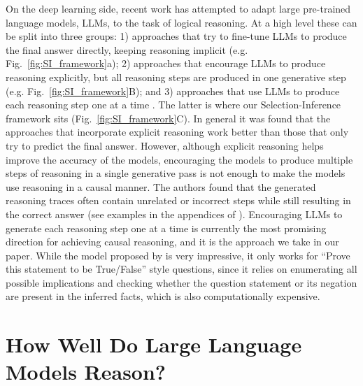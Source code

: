On the deep learning side, recent work has attempted to adapt large pre-trained language models, LLMs, to the task of logical reasoning. At a high level these can be split into three groups: 1) approaches that try to fine-tune LLMs to produce the final answer directly, keeping reasoning implicit \citep{betz2020critical, clark2020transformers} (e.g. Fig.~\ref{fig:SI_framework}a); 2) approaches that encourage LLMs to produce reasoning explicitly, but all reasoning steps are produced in one generative step \citep{nye2021show, zelikman2022star,jhamtani2020learning,Dalvi2021ExplainingAW,wei2022chain,cobbe2021training} (e.g. Fig.~\ref{fig:SI_framework}B); and 3) approaches that use LLMs to produce each reasoning step one at a time \citep{tafjord2020proofwriter}. The latter is where our Selection-Inference framework sits (Fig.~\ref{fig:SI_framework}C). In general it was found that the approaches that incorporate explicit reasoning work better than those that only try to predict the final answer. However, although explicit reasoning helps improve the accuracy of the models, encouraging the models to produce multiple steps of reasoning in a single generative pass is not enough to make the models use reasoning in a causal manner. The authors found that the generated reasoning traces often contain unrelated or incorrect steps while still resulting in the correct answer (see examples in the appendices of \citep{zelikman2022star, wei2022chain}). Encouraging LLMs to generate each reasoning step one at a time \citep{tafjord2020proofwriter} is currently the most promising direction for achieving causal reasoning, and it is the approach we take in our paper. While the model proposed by \cite{tafjord2020proofwriter} is very impressive, it only works for ``Prove this statement to be True/False'' style questions, since it relies on enumerating all possible implications and checking whether the question statement or its negation are present in the inferred facts, which is also computationally expensive. 

\section{How Well Do Large Language Models Reason?}\label{sec:how_well_do_llms_reason}

